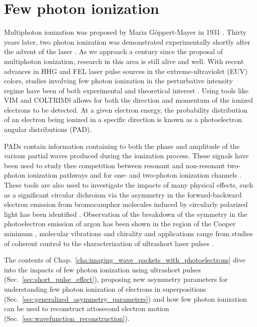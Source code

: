 \section{Few photon ionization} %
\label{sec:few_photon_ionization}
Multiphoton ionization was proposed by Maria G\"oppert-Mayer in 1931 \cite{goppertmayer1931}. Thirty years later, two photon ionization was demonstrated experimentally shortly after the advent of the laser \cite{kaiser1961}. As we approach a century since the proposal of multiphoton ionization, research in this area is still alive and well. With recent advances in HHG and FEL laser pulse sources in the extreme-ultraviolet (EUV) colors, studies involving few photon ionization in the perturbative intensity regime have been of both experimental and theoretical interest \cite{nikolopoulos2001,vanderhart2005,shakeshaft2007,pi2010,florescu2011,sato2011,haber2011,florescu2012,ishikawa2012,ishikawa2013,ma2013,rey2014,grum-grzhimailo2015,douguet2016,hofbrucker2017,hofbrucker2018,boll2019,wang2019}. Using tools like VIM and COLTRIMS allows for both the direction and momentum of the ionized electrons to be detected. At a given electron energy, the probability distribution of an electron being ionized in a specific direction is known as a photoelectron angular distributions (PAD). 

PADs contain information containing to both the phase and amplitude of the various partial waves produced during the ionization process. These signals have been used to study thee competition between resonant and non-resonant two-photon ionization pathways \cite{ishikawa2012,ishikawa2013,ma2013} and for one- and two-photon ionization channels \cite{grum-grzhimailo2015,douguet2016,boll2019}.
These tools are also used to investigate the impacts of many physical effects, such as a significant circular dichroism via the asymmetry in the forward-backward electron emission from bromocamphor molecules induced by circularly polarized light has been identified  \cite{bowering2001}. Observation of the breakdown of the symmetry in the photoelectron emission of argon has been shown in the region of the Cooper minimum \cite{ilchen2018}, molecular vibrations and chirality \cite{garcia2013} and applications range from studies of coherent control \cite{prince2016} to the characterization of ultrashort laser pulses \cite{chelkowski2002}.

The contents of Chap.~\ref{cha:imaging_wave_packets_with_photoelectrons} dive into the impacts of few photon ionization using ultrashort pulses (Sec.~\ref{sec:short_pulse_effect}), proposing new asymmetry parameters for understanding few photon ionization of electrons in superpositions  (Sec.~\ref{sec:generalized_asymmetry_parameters}) and how few photon ionization can be used to reconstruct attosecond electron motion (Sec.~\ref{sec:wavefunction_reconstruction}).

